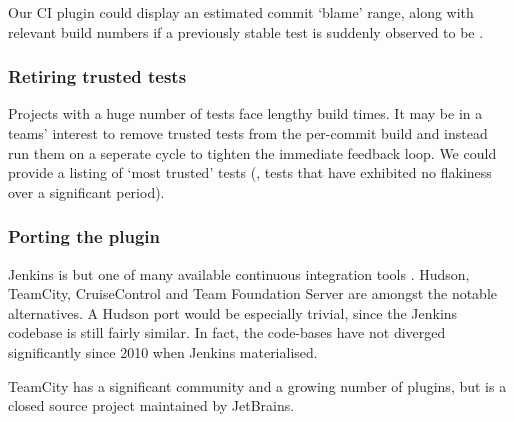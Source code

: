 Our CI plugin could display an estimated commit {\lq}blame{\rq} range, along with relevant build numbers if a previously stable test is suddenly observed to be \flaky{}.

\subsubsection{Retiring trusted tests}

Projects with a huge number of tests face lengthy build times. It may be in a teams' interest to remove trusted tests from the per-commit build and instead run them on a seperate cycle to tighten the immediate feedback loop. We could provide a listing of {\lq}most trusted{\rq} tests (\ie, tests that have exhibited no flakiness over a significant period).

\subsubsection{Porting the plugin}

Jenkins is but one of many available continuous integration tools \cite{ContinuousIntegrationSoftware}. Hudson, TeamCity, CruiseControl and Team Foundation Server are amongst the notable alternatives. A Hudson port would be especially trivial, since the Jenkins codebase is still fairly similar. In fact, the code-bases have not diverged significantly since 2010 when Jenkins materialised.

TeamCity \cite{TeamCity} has a significant community and a growing number of plugins, but is a closed source project maintained by JetBrains.

